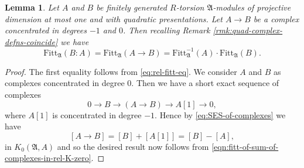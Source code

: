 \documentclass[12pt]{amsart}
\theoremstyle{plain}
\newtheorem{lemma}[theorem]{Lemma}
\theoremstyle{remark}
\theoremstyle{definition}
\numberwithin{equation}{section}
\begin{document}
\begin{lemma}\label{lem:fitt-eq-complex-quad}
Let $A$ and $B$ be finitely generated $R$-torsion $\mathfrak{A}$-modules 
of projective dimension at most one and with quadratic presentations.
Let $A \rightarrow B$ be a complex concentrated in degrees $-1$ and $0$. 
Then recalling Remark \ref{rmk:quad-complex-defns-coincide} we have
\[
{\mathrm{Fitt}}_{\mathfrak{A}}(B:A) = {\mathrm{Fitt}}_{\mathfrak{A}}(A \rightarrow B) = {\mathrm{Fitt}}_{\mathfrak{A}}^{-1}(A) \cdot {\mathrm{Fitt}}_{\mathfrak{A}}(B).
\] 
\end{lemma}

\begin{proof}
The first equality follows from \eqref{eq:rel-fitt-eq}.
We consider $A$ and $B$ as complexes concentrated in degree $0$.
Then we have a short exact sequence of complexes
\[
0 \longrightarrow B \longrightarrow (A \rightarrow B) \longrightarrow A[1] \longrightarrow 0,
\] 
where $A[1]$ is concentrated in degree $-1$. 
Hence by \eqref{eq:SES-of-complexes} we have 
\[
[A \rightarrow B] = [B] + [A[1]] = [B] - [A],
\]
in $K_{0}(\mathfrak{A},A)$ and so the desired result now follows from \eqref{eqn:fitt-of-sum-of-complexes-in-rel-K-zero}.  
\end{proof}
\end{document}
